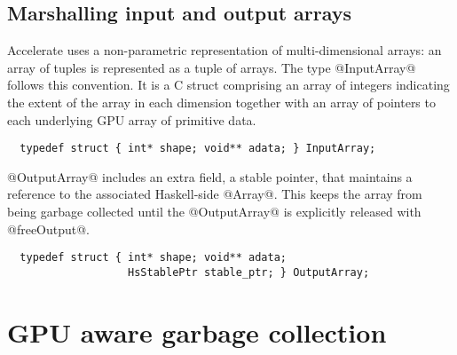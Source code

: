 \subsection{Marshalling input and output arrays}

Accelerate uses a non-parametric representation of multi-dimensional arrays: an array of tuples is represented as a tuple of arrays. The type @InputArray@ follows this convention. It is a C struct comprising an array of integers indicating the extent of the array in each dimension together with an array of pointers to each underlying GPU array of primitive data.
%
{\small
\begin{lstlisting}
  typedef struct { int* shape; void** adata; } InputArray;
\end{lstlisting}
}

@OutputArray@ includes an extra field, a stable pointer, that maintains a reference to the associated Haskell-side @Array@. This keeps the array from being garbage collected until the @OutputArray@ is explicitly released with @freeOutput@.
%
{\small
\begin{lstlisting}
  typedef struct { int* shape; void** adata;
                   HsStablePtr stable_ptr; } OutputArray;
\end{lstlisting}
}


\section{GPU aware garbage collection}
